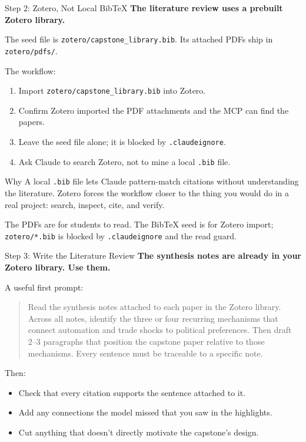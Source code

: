 \documentclass[aspectratio=169, 11pt]{beamer}
\begin{document}
\begin{frame}{Step 2: Zotero, Not Local BibTeX}
  \textbf{The literature review uses a prebuilt Zotero library.}

  \vspace{0.4em}
  The seed file is \texttt{zotero/capstone\_library.bib}. Its attached PDFs ship in \texttt{zotero/pdfs/}.

  \vspace{0.5em}
  The workflow:
  \begin{enumerate}\small
    \item Import \texttt{zotero/capstone\_library.bib} into Zotero.
    \item Confirm Zotero imported the PDF attachments and the MCP can find the papers.
    \item Leave the seed file alone; it is blocked by \texttt{.claudeignore}.
    \item Ask Claude to search Zotero, not to mine a local \texttt{.bib} file.
  \end{enumerate}

  \vspace{0.6em}
  \begin{block}{Why}
    A local \texttt{.bib} file lets Claude pattern-match citations without understanding the literature. Zotero forces the workflow closer to the thing you would do in a real project: search, inspect, cite, and verify.
  \end{block}

  \vspace{0.3em}
  \alert{\small The PDFs are for students to read. The BibTeX seed is for Zotero import; \texttt{zotero/*.bib} is blocked by \texttt{.claudeignore} and the read guard.}
\end{frame}

\begin{frame}{Step 3: Write the Literature Review}
  \textbf{The synthesis notes are already in your Zotero library. Use them.}

  \vspace{0.5em}
  A useful first prompt:
  \begin{quote}\small
    Read the synthesis notes attached to each paper in the Zotero library.
    Across all notes, identify the three or four recurring mechanisms that
    connect automation and trade shocks to political preferences. Then draft
    2--3 paragraphs that position the capstone paper relative to those
    mechanisms. Every sentence must be traceable to a specific note.
  \end{quote}

  \vspace{0.4em}
  Then:
  \begin{itemize}\small
    \item Check that every citation supports the sentence attached to it.
    \item Add any connections the model missed that you saw in the highlights.
    \item Cut anything that doesn't directly motivate the capstone's design.
  \end{itemize}
\end{frame}
\end{document}
